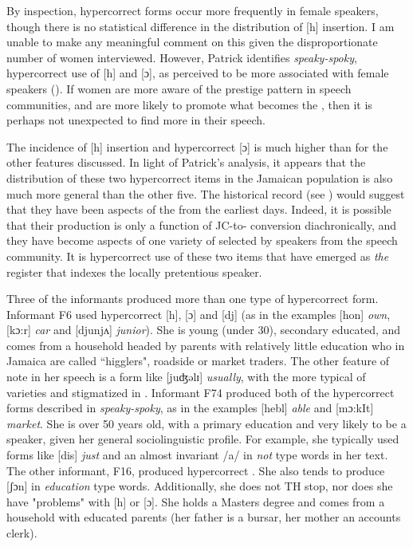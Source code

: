 By inspection, hypercorrect forms occur more frequently in female speakers, though there is no statistical difference in the  distribution of [h] insertion.  I am unable to make any meaningful comment on this given the disproportionate number of women interviewed.  However, Patrick identifies \textit{speaky-spoky}, hypercorrect use of [h] and [ɔ], as perceived to be more associated with female speakers (\citeyear[45]{Patrick1997}).  If women are more aware of the prestige pattern in speech communities, and are more likely to promote what becomes the , then it is perhaps not unexpected to find more  in their speech.  

The incidence of [h] insertion and hypercorrect [ɔ] is much higher than for the other features discussed.  In light of Patrick's analysis, it appears that the distribution of these two hypercorrect items in the Jamaican population is also much more general than the other five.  The historical record (see ) would suggest that they have been aspects of the  from the earliest days.  Indeed, it is possible that their production is only a function of JC-to- conversion diachronically, and they have become aspects of one variety of  selected by speakers from the speech community.  It is hypercorrect use of these two items that have emerged as \textit{the} register that indexes the locally pretentious speaker.  

Three of the informants produced more than one type of hypercorrect form.  Informant F6 used hypercorrect [h], [ɔ] and [dj] (as in the examples [hon] \textit{own}, [kɔ:r] \textit{car} and [djunjʌ] \textit{junior}).  She is young (under 30), secondary educated, and comes from a household headed by parents with relatively little education who in Jamaica are called ``higglers", roadside or market traders.  The other feature of note in her speech is a form like [juʤǝlɪ] \textit{usually}, with the  more typical of  varieties and stigmatized in .  Informant F74 produced both of the hypercorrect forms described in \textit{speaky-spoky}, as in the examples [hebl] \textit{able} and [mɔ:kIt] \textit{market}.  She is over 50 years old, with a primary education and very likely to be a   speaker, given her general sociolinguistic profile.   For example, she typically used  forms like [dis] \textit{just} and an almost invariant  /a/ in \textit{not} type words in her text.  The other informant, F16, produced hypercorrect .  She also tends to produce [ʃɔn] in \textit{education} type words.  Additionally, she does not TH stop, nor does she have "problems" with [h] or [ɔ].  She holds a Masters degree and comes from a household with educated parents (her father is a bursar, her mother an accounts clerk).

